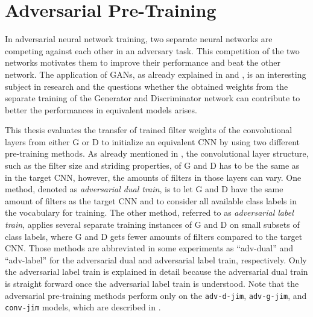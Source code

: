 
\section{Adversarial Pre-Training}\label{sec:nn_adv}
In adversarial neural network training, two separate neural networks are competing against each other in an adversary task.
This competition of the two networks motivates them to improve their performance and beat the other network.
The application of GANs, as already explained in  and , is an interesting subject in research and the questions whether the obtained weights from the separate training of the Generator and Discriminator network can contribute to better the performances in equivalent models arises.

This thesis evaluates the transfer of trained filter weights of the convolutional layers from either G or D to initialize an equivalent CNN by using two different pre-training methods.
As already mentioned in , the convolutional layer structure, such as the filter size and striding properties, of G and D has to be the same as in the target CNN, however, the amounts of filters in those layers can vary.
One method, denoted as \emph{adversarial dual train}, is to let G and D have the same amount of filters as the target CNN and to consider all available class labels in the vocabulary for training.
The other method, referred to as \emph{adversarial label train}, applies several separate training instances of G and D on small subsets of class labels, where G and D gets fewer amounts of filters compared to the target CNN.
Those methods are abbreviated in some experiments as \enquote{adv-dual} and \enquote{adv-label} for the adversarial dual and adversarial label train, respectively.
Only the adversarial label train is explained in detail because the adversarial dual train is straight forward once the adversarial label train is understood.
Note that the adversarial pre-training methods perform only on the \texttt{adv-d-jim}, \texttt{adv-g-jim}, and \texttt{conv-jim} models, which are described in .



